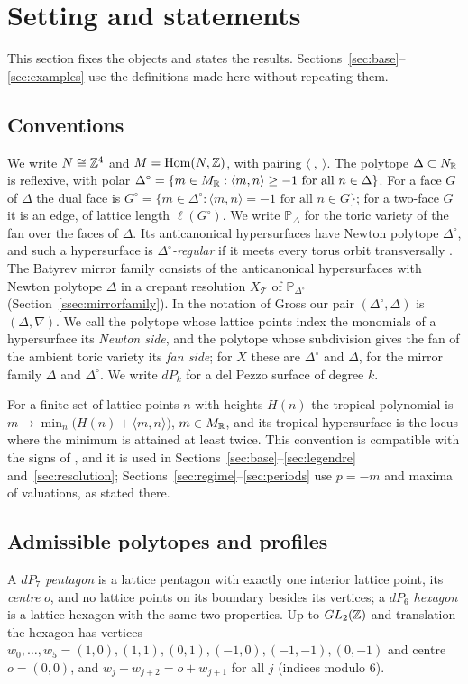 \section{Setting and statements}\label{sec:statements}

This section fixes the objects and states the results. Sections~\ref{sec:base}--\ref{sec:examples} use the
definitions made here without repeating them.

\subsection{Conventions}\label{ssec:conventions}
We write $N\cong\mathbb Z^4$ and $M=\operatorname{Hom}(N,\mathbb Z)$, with pairing $\langle\ ,\ \rangle$. The polytope
$\Delta\subset N_\mathbb R$ is reflexive, with polar $\Delta^\circ=\{m\in M_\mathbb R:\langle m,n\rangle\ge-1\text{ for all }n\in\Delta\}$.
For a face $G$ of $\Delta$ the dual face is $G^\circ=\{m\in\Delta^\circ:\langle m,n\rangle=-1\text{ for all }n\in G\}$; for a
two-face $G$ it is an edge, of lattice length $\ell(G^\circ)$. We write $\mathbb P_\Delta$ for the toric variety of the fan
over the faces of $\Delta$. Its anticanonical hypersurfaces have Newton polytope $\Delta^\circ$, and such a hypersurface is
\emph{$\Delta^\circ$-regular} if it meets every torus orbit transversally \cite[\S3]{Batyrev}. The Batyrev mirror family
consists of the anticanonical hypersurfaces with Newton polytope $\Delta$ in a crepant resolution $X_{\mathcal T}$ of
$\mathbb P_{\Delta^\circ}$ (Section~\ref{ssec:mirrorfamily}). In the notation of Gross \cite{Gross2005} our pair
$(\Delta^\circ,\Delta)$ is $(\Delta,\nabla)$. We call the polytope whose lattice points index the monomials of a
hypersurface its \emph{Newton side}, and the polytope whose subdivision gives the fan of the ambient toric variety its
\emph{fan side}; for $X$ these are $\Delta^\circ$ and $\Delta$, for the mirror family $\Delta$ and $\Delta^\circ$.
We write $dP_k$ for a del Pezzo surface of degree $k$.

For a finite set of lattice points $n$ with heights $H(n)$ the tropical polynomial is
$m\mapsto\min_n\bigl(H(n)+\langle m,n\rangle\bigr)$, $m\in M_\mathbb R$, and its tropical hypersurface is the locus where the minimum is
attained at least twice. This convention is compatible with the signs of \cite{Gross2005}, and it is used in
Sections~\ref{sec:base}--\ref{sec:legendre} and~\ref{sec:resolution}; Sections~\ref{sec:regime}--\ref{sec:periods} use $p=-m$ and maxima of valuations, as stated
there.

\subsection{Admissible polytopes and profiles}\label{ssec:admissible}
A \emph{$dP_7$ pentagon} is a lattice pentagon with exactly one interior lattice point, its \emph{centre} $o$, and no
lattice points on its boundary besides its vertices; a \emph{$dP_6$ hexagon} is a lattice hexagon with the same two
properties. Up to $GL_2(\mathbb Z)$ and translation the hexagon has vertices $w_0,\dots,w_5=(1,0),(1,1),(0,1),(-1,0),(-1,-1),(0,-1)$ and centre
$o=(0,0)$, and $w_j+w_{j+2}=o+w_{j+1}$ for all $j$ (indices modulo $6$).

